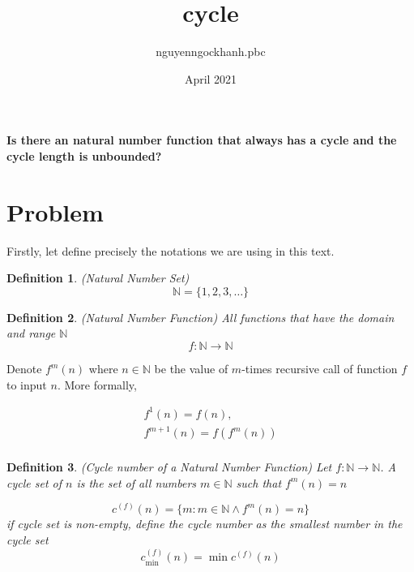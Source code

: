 \documentclass{article}
\title{cycle}
\author{nguyenngockhanh.pbc }
\date{April 2021}
\newtheorem{definition}{Definition}
\begin{document}
    \maketitle

    \textbf{Is there an natural number function that always has a cycle and the cycle length is unbounded?}


    \section{Problem}\label{sec:problem}

    Firstly, let define precisely the notations we are using in this text.

    \begin{definition}(Natural Number Set)
        \begin{equation}
            \label{eq:natural}
            \mathbb{N} = \{ 1, 2, 3, \dots \}
        \end{equation}
    \end{definition}

    \begin{definition}(Natural Number Function)
        All functions that have the domain and range $\mathbb{N}$
        \begin{equation}
            \label{eq:function}
            f: \mathbb{N} \to \mathbb{N}
        \end{equation}
    \end{definition}

    Denote $f^m(n)$ where $n \in \mathbb{N}$ be the value of $m$-times recursive call of function $f$ to input $n$.
    More formally,

    \begin{gather*}
        f^1(n) = f(n),\\
        f^{m+1}(n) = f(f^m(n))\\
    \end{gather*}


    \begin{definition}(Cycle number of a Natural Number Function)
        Let $f: \mathbb{N} \to \mathbb{N}$.
        A cycle set of $n$ is the set of all numbers $m \in \mathbb{N}$ such that $f^m(n) = n$

        \begin{equation}
            \label{eq:cycle_set}
            c^{(f)}(n) = \{m : m \in \mathbb{N} \land f^m(n) = n \}
        \end{equation}
        if cycle set is non-empty, define the cycle number as the smallest number in the cycle set
        \begin{equation}
            \label{eq:cycle_number}
            c^{(f)}_{\min}(n) = \min{c^{(f)}(n)}
        \end{equation}
    \end{definition}
\end{document}
